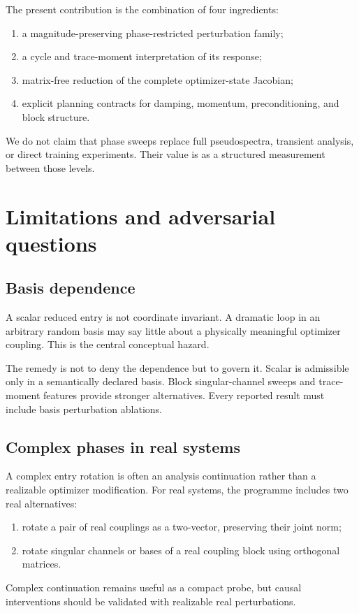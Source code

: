 The present contribution is the combination of four ingredients:
\begin{enumerate}[leftmargin=1.7em]
\item a magnitude-preserving phase-restricted perturbation family;
\item a cycle and trace-moment interpretation of its response;
\item matrix-free reduction of the complete optimizer-state Jacobian;
\item explicit planning contracts for damping, momentum, preconditioning, and block structure.
\end{enumerate}
We do not claim that phase sweeps replace full pseudospectra, transient analysis, or direct training experiments.  Their value is as a structured measurement between those levels.

\section{Limitations and adversarial questions}

\subsection{Basis dependence}

A scalar reduced entry is not coordinate invariant.  A dramatic loop in an arbitrary random basis may say little about a physically meaningful optimizer coupling.  This is the central conceptual hazard.

The remedy is not to deny the dependence but to govern it.  Scalar \cps{} is admissible only in a semantically declared basis.  Block singular-channel sweeps and trace-moment features provide stronger alternatives.  Every reported result must include basis perturbation ablations.

\subsection{Complex phases in real systems}

A complex entry rotation is often an analysis continuation rather than a realizable optimizer modification.  For real systems, the programme includes two real alternatives:
\begin{enumerate}[leftmargin=1.7em]
\item rotate a pair of real couplings as a two-vector, preserving their joint norm;
\item rotate singular channels or bases of a real coupling block using orthogonal matrices.
\end{enumerate}
Complex continuation remains useful as a compact probe, but causal interventions should be validated with realizable real perturbations.

